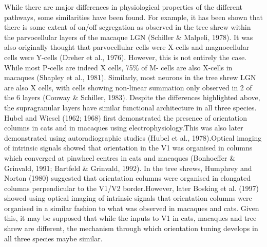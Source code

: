 	While there are major differences in physiological properties of the different pathways, some similarities have been found. For example, it has been shown that there is some extent of on/off segregation as observed in the tree shrew within the parvocellular layers of the macaque LGN (Schiller \& Malpeli, 1978). It was also originally thought that parvocellular cells were X-cells and magnocellular cells were Y-cells (Dreher et al., 1976). However, this is not entirely the case. While most P-cells are indeed X cells, 75\% of M- cells are also X-cells in macaques (Shapley et al., 1981). Similarly, most neurons in the tree shrew LGN are also X cells, with cells showing non-linear summation only observed in 2 of the 6 layers (Conway \& Schiller, 1983).
	Despite the differences highlighted above, the supragranular layers have similar functional architecture in all three species. Hubel and Wiesel (1962; 1968) first demonstrated the presence of orientation columns in cats and in macaques using electrophysiology.This was also later demonstrated using autoradiographic studies (Hubel et al., 1978).Optical imaging of intrinsic signals showed that orientation in the V1 was organised in columns which converged at pinwheel centres in cats and macaques (Bonhoeffer \& Grinvald, 1991; Bartfeld \& Grinvald, 1992). In the tree shrews, Humphrey and Norton (1980) suggested that orientation columns were organised in elongated columns perpendicular to the V1/V2 border.However, later Bosking et al. (1997) showed using optical imaging of intrinsic signals that orientation columns were organised in a similar fashion to what was observed in macaques and cats. Given this, it may be supposed that while the inputs to V1 in cats, macaques and tree shrew are different, the mechanism through which orientation tuning develops in all three species maybe similar. 


